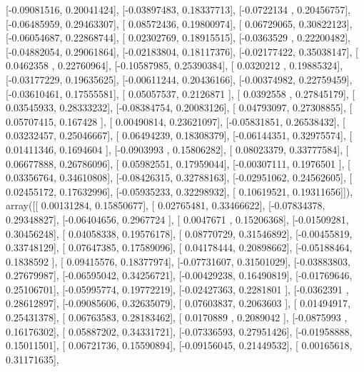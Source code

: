 \documentclass{article}
\begin{document}
       [-0.09081516,  0.20041424],
       [-0.03897483,  0.18337713],
       [-0.0722134 ,  0.20456757],
       [-0.06485959,  0.29463307],
       [ 0.08572436,  0.19800974],
       [ 0.06729065,  0.30822123],
       [-0.06054687,  0.22868744],
       [ 0.02302769,  0.18915515],
       [-0.0363529 ,  0.22200482],
       [-0.04882054,  0.29061864],
       [-0.02183804,  0.18117376],
       [-0.02177422,  0.35038147],
       [ 0.0462358 ,  0.22760964],
       [-0.10587985,  0.25390384],
       [ 0.0320212 ,  0.19885324],
       [-0.03177229,  0.19635625],
       [-0.00611244,  0.20436166],
       [-0.00374982,  0.22759459],
       [-0.03610461,  0.17555581],
       [ 0.05057537,  0.2126871 ],
       [ 0.0392558 ,  0.27845179],
       [ 0.03545933,  0.28333232],
       [-0.08384754,  0.20083126],
       [ 0.04793097,  0.27308855],
       [ 0.05707415,  0.167428  ],
       [ 0.00490814,  0.23621097],
       [-0.05831851,  0.26538432],
       [ 0.03232457,  0.25046667],
       [ 0.06494239,  0.18308379],
       [-0.06144351,  0.32975574],
       [ 0.01411346,  0.1694604 ],
       [-0.0903993 ,  0.15806282],
       [ 0.08023379,  0.33777584],
       [ 0.06677888,  0.26786096],
       [ 0.05982551,  0.17959044],
       [-0.00307111,  0.1976501 ],
       [ 0.03356764,  0.34610808],
       [-0.08426315,  0.32788163],
       [-0.02951062,  0.24562605],
       [ 0.02455172,  0.17632996],
       [-0.05935233,  0.32298932],
       [ 0.10619521,  0.19311656]]), array([[ 0.00131284,  0.15850677],
       [ 0.02765481,  0.33466622],
       [-0.07834378,  0.29348827],
       [-0.06404656,  0.2967724 ],
       [ 0.0047671 ,  0.15206368],
       [-0.01509281,  0.30456248],
       [ 0.04058338,  0.19576178],
       [ 0.08770729,  0.31546892],
       [-0.00455819,  0.33748129],
       [ 0.07647385,  0.17589096],
       [ 0.04178444,  0.20898662],
       [-0.05188464,  0.1838592 ],
       [ 0.09415576,  0.18377974],
       [-0.07731607,  0.31501029],
       [-0.03883803,  0.27679987],
       [-0.06595042,  0.34256721],
       [-0.00429238,  0.16490819],
       [-0.01769646,  0.25106701],
       [-0.05995774,  0.19772219],
       [-0.02427363,  0.2281801 ],
       [-0.0362391 ,  0.28612897],
       [-0.09085606,  0.32635079],
       [ 0.07603837,  0.2063603 ],
       [ 0.01494917,  0.25431378],
       [ 0.06763583,  0.28183462],
       [ 0.0170889 ,  0.2089042 ],
       [-0.0875993 ,  0.16176302],
       [ 0.05887202,  0.34331721],
       [-0.07336593,  0.27951426],
       [-0.01958888,  0.15011501],
       [ 0.06721736,  0.15590894],
       [-0.09156045,  0.21449532],
       [ 0.00165618,  0.31171635],
\end{document}
